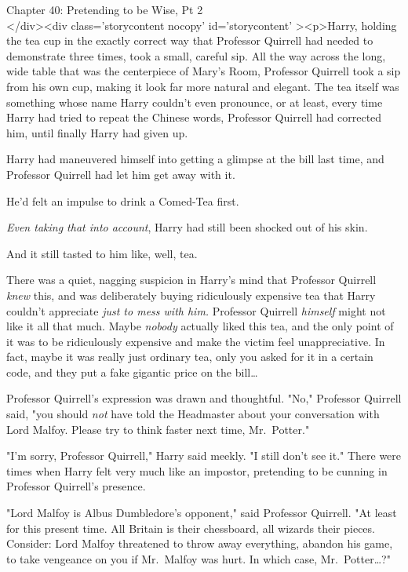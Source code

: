 
Chapter 40: Pretending to be Wise, Pt 2\\
</div><div  class='storycontent nocopy' id='storycontent' ><p>Harry, holding 
the tea cup in the exactly correct way that Professor Quirrell had needed to 
demonstrate three times, took a small, careful sip. All the way across the 
long, wide table that was the centerpiece of Mary's Room, Professor Quirrell 
took a sip from his own cup, making it look far more natural and elegant. The 
tea itself was something whose name Harry couldn't even pronounce, or at least, 
every time Harry had tried to repeat the Chinese words, Professor Quirrell had 
corrected him, until finally Harry had given up.

Harry had maneuvered himself into getting a glimpse at the bill last time, and 
Professor Quirrell had let him get away with it.

He'd felt an impulse to drink a Comed-Tea first.

\emph{Even taking that into account}, Harry had still been shocked out of his 
skin.

And it still tasted to him like, well, tea.

There was a quiet, nagging suspicion in Harry's mind that Professor Quirrell 
\emph{knew} this, and was deliberately buying ridiculously expensive tea that 
Harry couldn't appreciate \emph{just to mess with him.} Professor Quirrell 
\emph{himself} might not like it all that much. Maybe \emph{nobody} actually 
liked this tea, and the only point of it was to be ridiculously expensive and 
make the victim feel unappreciative. In fact, maybe it was really just ordinary 
tea, only you asked for it in a certain code, and they put a fake gigantic 
price on the bill{\ldots}

Professor Quirrell's expression was drawn and thoughtful. "No," Professor 
Quirrell said, "you should \emph{not} have told the Headmaster about your 
conversation with Lord Malfoy. Please try to think faster next time, 
Mr.~Potter."

"I'm sorry, Professor Quirrell," Harry said meekly. "I still don't see it." 
There were times when Harry felt very much like an impostor, pretending to be 
cunning in Professor Quirrell's presence.

"Lord Malfoy is Albus Dumbledore's opponent," said Professor Quirrell. "At 
least for this present time. All Britain is their chessboard, all wizards their 
pieces. Consider: Lord Malfoy threatened to throw away everything, abandon his 
game, to take vengeance on you if Mr.~Malfoy was hurt. In which case, 
Mr.~Potter{\ldots}?"

